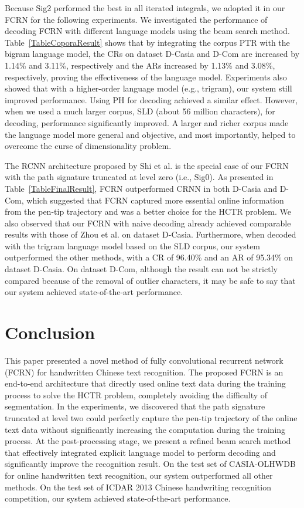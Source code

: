 \documentclass[10pt,conference,a4paper]{IEEEtran}
\begin{document}
Because Sig2 performed the best in all iterated integrals, we adopted it in our FCRN for the following experiments.
We investigated the performance of decoding FCRN with different language models using the beam search method. Table~\ref{TableCoporaResult} shows that by integrating the corpus PTR with the bigram language model, the CRs on dataset D-Casia and D-Com are increased by 1.14\% and 3.11\%, respectively and the ARs increased by 1.13\% and 3.08\%, respectively, proving the effectiveness of the language model. Experiments also showed that with a higher-order language model (e.g., trigram), our system still improved performance. %
Using PH for decoding achieved a similar effect.
However, when we used a much larger corpus, SLD (about 56 million characters), for decoding, performance significantly improved. A larger and richer corpus made the language model more general and objective, and most importantly, helped to overcome the curse of dimensionality problem\cite{bengio2006neural}.

The RCNN architecture proposed by Shi et al.\cite{shi2015end} is the special case of our FCRN with the path signature truncated at level zero (i.e., Sig0).
As presented in Table~\ref{TableFinalResult}, FCRN outperformed CRNN in both D-Casia and D-Com, which suggested that FCRN captured more essential online information from the pen-tip trajectory and was a better choice for the HCTR problem.
We also observed that our FCRN with naive decoding already achieved comparable results with those of Zhou et al.\cite{zhou2013handwritten}\cite{zhou2014minimum} on dataset D-Casia.
Furthermore, when decoded with the trigram language model based on the SLD corpus, our system outperformed the other methods, with a CR of 96.40\% and an AR of 95.34\% on dataset D-Casia.
On dataset D-Com, although the result can not be strictly compared because of the removal of outlier characters, it may be safe to say that our system achieved state-of-the-art performance.

\section{Conclusion}
This paper presented a novel method of fully convolutional recurrent network (FCRN) for handwritten Chinese text recognition.
The proposed FCRN is an end-to-end architecture that directly used online text data during the training process to solve the HCTR problem, completely avoiding the difficulty of segmentation.
In the experiments, we discovered that the path signature truncated at level two could perfectly capture the pen-tip trajectory of the online text data without significantly increasing the computation during the training process.
At the post-processing stage, we present a refined beam search method that effectively integrated explicit language model to perform decoding and significantly improve the recognition result.
On the test set of CASIA-OLHWDB for online handwritten text recognition, our system outperformed all other methods.
On the test set of ICDAR 2013 Chinese handwriting recognition competition, our system achieved state-of-the-art performance.
\end{document}
